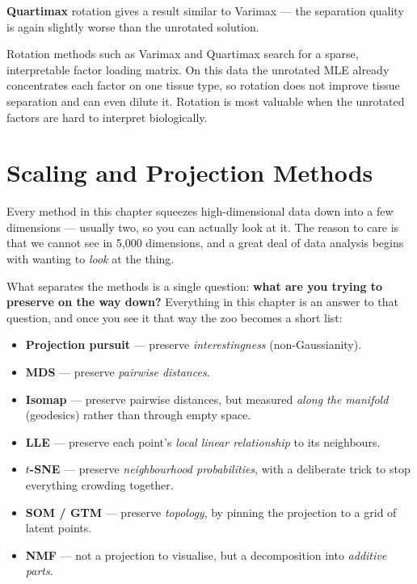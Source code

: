\documentclass[11pt, oneside]{book}
\begin{document}
\textbf{Quartimax} rotation gives a result similar to Varimax — the separation
quality is again slightly worse than the unrotated solution.

\begin{intbox}[title={Rotation does not help here}]
Rotation methods such as Varimax and Quartimax search for a sparse, interpretable
factor loading matrix.
On this data the unrotated MLE already concentrates each factor on one tissue
type, so rotation does not improve tissue separation and can even dilute it.
Rotation is most valuable when the unrotated factors are hard to interpret
biologically.
\end{intbox}


\chapter{Scaling and Projection Methods}

Every method in this chapter squeezes high-dimensional data down into a few
dimensions --- usually two, so you can actually look at it.
The reason to care is that we cannot see in 5{,}000 dimensions, and a great deal
of data analysis begins with wanting to \emph{look} at the thing.

What separates the methods is a single question: \textbf{what are you trying to
preserve on the way down?}
Everything in this chapter is an answer to that question, and once you see it
that way the zoo becomes a short list:

\begin{itemize}
  \item \textbf{Projection pursuit} --- preserve \emph{interestingness}
        (non-Gaussianity).
  \item \textbf{MDS} --- preserve \emph{pairwise distances}.
  \item \textbf{Isomap} --- preserve pairwise distances, but measured
        \emph{along the manifold} (geodesics) rather than through empty space.
  \item \textbf{LLE} --- preserve each point's \emph{local linear relationship}
        to its neighbours.
  \item \textbf{$t$-SNE} --- preserve \emph{neighbourhood probabilities}, with a
        deliberate trick to stop everything crowding together.
  \item \textbf{SOM / GTM} --- preserve \emph{topology}, by pinning the projection
        to a grid of latent points.
  \item \textbf{NMF} --- not a projection to visualise, but a decomposition into
        \emph{additive parts}.
\end{itemize}
\end{document}
